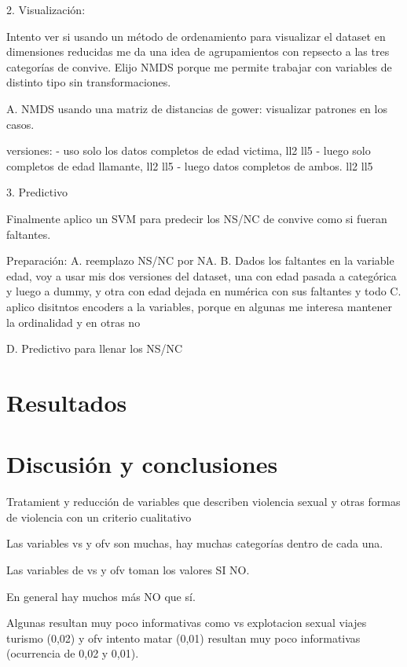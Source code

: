 \documentclass[10pt, spanish]{article}
\begin{document}
2. Visualización:

Intento ver si usando un método de ordenamiento para visualizar el dataset en dimensiones reducidas me da una
idea de agrupamientos con repsecto a las tres categorías de convive. Elijo NMDS porque me permite trabajar con
variables de distinto tipo sin transformaciones.



A. NMDS usando una matriz de distancias de gower: visualizar patrones en los casos. 

versiones:  
- uso solo los datos completos de edad victima, ll2 ll5
- luego solo completos de edad llamante, ll2 ll5
- luego datos completos de ambos. ll2 ll5



3. Predictivo

Finalmente aplico un SVM para predecir los NS/NC de convive como si fueran faltantes.

Preparación: 
A. reemplazo NS/NC por NA.
B. Dados los faltantes en la variable edad, voy a usar mis dos versiones del dataset, una con
edad pasada a categórica y luego a dummy, y otra con edad dejada en numérica con sus faltantes y todo
C. aplico disitntos encoders a la variables, porque en algunas me interesa mantener la ordinalidad y en otras no


D. Predictivo para llenar los NS/NC  

\section{Resultados}\label{res}

\section{Discusión y conclusiones}\label{conc}




Tratamient y reducción de variables que describen violencia sexual y otras formas de violencia con un criterio cualitativo

Las variables vs y ofv son muchas, hay muchas categorías dentro de cada una.

Las variables de vs y ofv toman los valores SI NO.

En general hay muchos más NO que sí.

Algunas resultan muy poco informativas como vs explotacion sexual viajes turismo (0,02) y ofv intento matar (0,01) resultan muy poco informativas (ocurrencia de 0,02 y 0,01).
\end{document}

